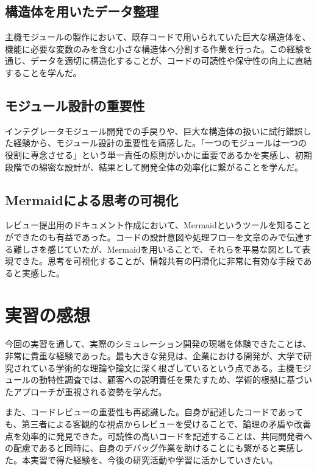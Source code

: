 \documentclass[a4j,11pt]{jsarticle}
\begin{document}
\subsection{構造体を用いたデータ整理}
主機モジュールの製作において、既存コードで用いられていた巨大な構造体を、機能に必要な変数のみを含む小さな構造体へ分割する作業を行った。この経験を通じ、データを適切に構造化することが、コードの可読性や保守性の向上に直結することを学んだ。

\subsection{モジュール設計の重要性}
インテグレータモジュール開発での手戻りや、巨大な構造体の扱いに試行錯誤した経験から、モジュール設計の重要性を痛感した。「一つのモジュールは一つの役割に専念させる」という単一責任の原則がいかに重要であるかを実感し、初期段階での綿密な設計が、結果として開発全体の効率化に繋がることを学んだ。

\subsection{Mermaidによる思考の可視化}
レビュー提出用のドキュメント作成において、Mermaidというツールを知ることができたのも有益であった。コードの設計意図や処理フローを文章のみで伝達する難しさを感じていたが、Mermaidを用いることで、それらを平易な図として表現できた。思考を可視化することが、情報共有の円滑化に非常に有効な手段であると実感した。

\section{実習の感想}
\label{sec:thoughts}
今回の実習を通して、実際のシミュレーション開発の現場を体験できたことは、非常に貴重な経験であった。最も大きな発見は、企業における開発が、大学で研究されている学術的な理論や論文に深く根ざしているという点である。主機モジュールの動特性調査では、顧客への説明責任を果たすため、学術的根拠に基づいたアプローチが重視される姿勢を学んだ。

また、コードレビューの重要性も再認識した。自身が記述したコードであっても、第三者による客観的な視点からレビューを受けることで、論理の矛盾や改善点を効率的に発見できた。可読性の高いコードを記述することは、共同開発者への配慮であると同時に、自身のデバッグ作業を助けることにも繋がると実感した。本実習で得た経験を、今後の研究活動や学習に活かしていきたい。
\end{document}
